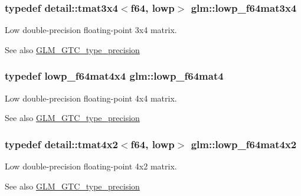 \subsubsection[{\texorpdfstring{lowp\+\_\+f64mat3x4}{lowp_f64mat3x4}}]{\setlength{\rightskip}{0pt plus 5cm}typedef detail\+::tmat3x4$<$f64, lowp$>$ {\bf glm\+::lowp\+\_\+f64mat3x4}}\hypertarget{group__gtc__type__precision_ga988c6645dead17a842c47ec042b5369e}{}\label{group__gtc__type__precision_ga988c6645dead17a842c47ec042b5369e}
Low double-\/precision floating-\/point 3x4 matrix. \begin{DoxySeeAlso}{See also}
\hyperlink{group__gtc__type__precision}{G\+L\+M\+\_\+\+G\+T\+C\+\_\+type\+\_\+precision} 
\end{DoxySeeAlso}
\subsubsection[{\texorpdfstring{lowp\+\_\+f64mat4}{lowp_f64mat4}}]{\setlength{\rightskip}{0pt plus 5cm}typedef lowp\+\_\+f64mat4x4 {\bf glm\+::lowp\+\_\+f64mat4}}\hypertarget{group__gtc__type__precision_ga4378d9384f1b24848043ccb02dcf2959}{}\label{group__gtc__type__precision_ga4378d9384f1b24848043ccb02dcf2959}
Low double-\/precision floating-\/point 4x4 matrix. \begin{DoxySeeAlso}{See also}
\hyperlink{group__gtc__type__precision}{G\+L\+M\+\_\+\+G\+T\+C\+\_\+type\+\_\+precision} 
\end{DoxySeeAlso}
\subsubsection[{\texorpdfstring{lowp\+\_\+f64mat4x2}{lowp_f64mat4x2}}]{\setlength{\rightskip}{0pt plus 5cm}typedef detail\+::tmat4x2$<$f64, lowp$>$ {\bf glm\+::lowp\+\_\+f64mat4x2}}\hypertarget{group__gtc__type__precision_ga37d10de43251a9a1be734bbb340ad2e7}{}\label{group__gtc__type__precision_ga37d10de43251a9a1be734bbb340ad2e7}
Low double-\/precision floating-\/point 4x2 matrix. \begin{DoxySeeAlso}{See also}
\hyperlink{group__gtc__type__precision}{G\+L\+M\+\_\+\+G\+T\+C\+\_\+type\+\_\+precision} 
\end{DoxySeeAlso}
